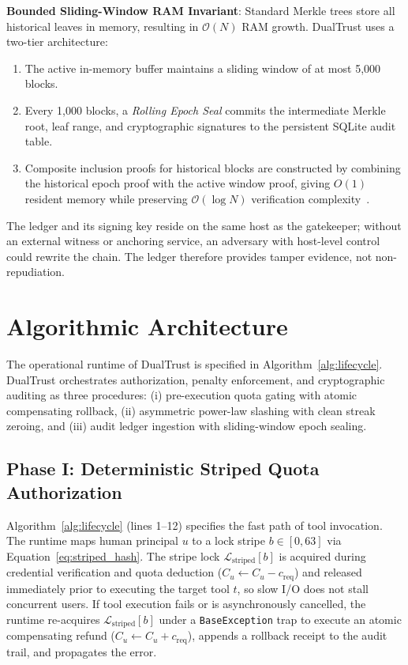 \documentclass[manuscript, screen, review]{jair}
\begin{document}
\textbf{Bounded Sliding-Window RAM Invariant}: Standard Merkle trees store all historical leaves in memory, resulting in $\mathcal{O}(N)$ RAM growth. DualTrust uses a two-tier architecture:
\begin{enumerate}[leftmargin=12pt, topsep=2pt, itemsep=1pt]
\item The active in-memory buffer maintains a sliding window of at most 5,000 blocks.
\item Every 1,000 blocks, a \emph{Rolling Epoch Seal} commits the intermediate Merkle root, leaf range, and cryptographic signatures to the persistent SQLite audit table.
\item Composite inclusion proofs for historical blocks are constructed by combining the historical epoch proof with the active window proof, giving $O(1)$ resident memory while preserving $\mathcal{O}(\log N)$ verification complexity~\cite{melara2015coniks}.
\end{enumerate}
The ledger and its signing key reside on the same host as the gatekeeper; without an external witness or anchoring service, an adversary with host-level control could rewrite the chain. The ledger therefore provides tamper evidence, not non-repudiation.

\section{Algorithmic Architecture}
\label{sec:algorithms}

The operational runtime of DualTrust is specified in Algorithm~\ref{alg:lifecycle}. DualTrust orchestrates authorization, penalty enforcement, and cryptographic auditing as three procedures: (i) pre-execution quota gating with atomic compensating rollback, (ii) asymmetric power-law slashing with clean streak zeroing, and (iii) audit ledger ingestion with sliding-window epoch sealing.

\subsection{Phase I: Deterministic Striped Quota Authorization}
Algorithm~\ref{alg:lifecycle} (lines 1--12) specifies the fast path of tool invocation. The runtime maps human principal $u$ to a lock stripe $b \in [0, 63]$ via Equation~\eqref{eq:striped_hash}. The stripe lock $\mathcal{L}_{\text{striped}}[b]$ is acquired during credential verification and quota deduction ($C_u \leftarrow C_u - c_{\text{req}}$) and released immediately prior to executing the target tool $t$, so slow I/O does not stall concurrent users. If tool execution fails or is asynchronously cancelled, the runtime re-acquires $\mathcal{L}_{\text{striped}}[b]$ under a \texttt{BaseException} trap to execute an atomic compensating refund ($C_u \leftarrow C_u + c_{\text{req}}$), appends a rollback receipt to the audit trail, and propagates the error.
\end{document}
